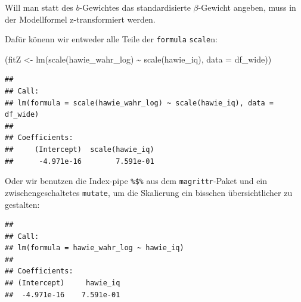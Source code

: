 \documentclass[
]{book}
\newenvironment{Shaded}{\begin{snugshade}}{\end{snugshade}}
\newcommand{\AttributeTok}[1]{\textcolor[rgb]{0.77,0.63,0.00}{#1}}
\newcommand{\FunctionTok}[1]{\textcolor[rgb]{0.00,0.00,0.00}{#1}}
\newcommand{\NormalTok}[1]{#1}
\newcommand{\OtherTok}[1]{\textcolor[rgb]{0.56,0.35,0.01}{#1}}
\newcommand{\SpecialCharTok}[1]{\textcolor[rgb]{0.00,0.00,0.00}{#1}}
\begin{document}
Will man statt des \(b\)-Gewichtes das standardisierte \(\beta\)-Gewicht angeben, muss in der Modellformel z-transformiert werden.

Dafür könenn wir entweder alle Teile der \texttt{formula} \texttt{scale}n:

\begin{Shaded}
\begin{Highlighting}[]
\NormalTok{(fitZ }\OtherTok{\textless{}{-}} \FunctionTok{lm}\NormalTok{(}\FunctionTok{scale}\NormalTok{(hawie\_wahr\_log) }\SpecialCharTok{\textasciitilde{}} \FunctionTok{scale}\NormalTok{(hawie\_iq), }
            \AttributeTok{data =}\NormalTok{ df\_wide))}
\end{Highlighting}
\end{Shaded}

\begin{verbatim}
## 
## Call:
## lm(formula = scale(hawie_wahr_log) ~ scale(hawie_iq), data = df_wide)
## 
## Coefficients:
##     (Intercept)  scale(hawie_iq)  
##      -4.971e-16        7.591e-01
\end{verbatim}

Oder wir benutzen die Index-pipe \texttt{\%\$\%} aus dem \texttt{magrittr}-Paket und ein zwischengeschaltetes \texttt{mutate}, um die Skalierung ein bisschen übersichtlicher zu gestalten:

\begin{Shaded}
\end{Shaded}

\begin{verbatim}
## 
## Call:
## lm(formula = hawie_wahr_log ~ hawie_iq)
## 
## Coefficients:
## (Intercept)     hawie_iq  
##  -4.971e-16    7.591e-01
\end{verbatim}
\end{document}
